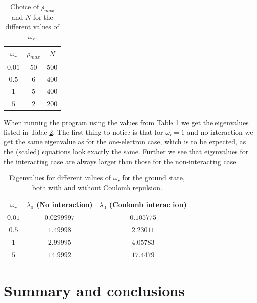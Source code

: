 \documentclass[12pt, a4paper]{article}
\begin{document}
\begin{table}
\begin{center}
\caption{Choice of $\rho_{max}$ and $N$ for the different values of $\omega_r$.}
\label{tab:rho_and_N}
\begin{tabular}{ccc} \hline \hline  
$\omega_r$ & $\rho_{max}$ & $N$ \\ \hline
$0.01$ & $50$ & $500$ \\
$0.5$  & $6$  & $400$ \\
$1$    & $5$  & $400$ \\
$5$    & $2$  & $200$ \\ \hline\hline
\end{tabular}
\end{center}
\end{table} 

When running the program using the values from Table \ref{tab:rho_and_N} we get the eigenvalues listed 
in Table \ref{tab:eigenvalues_2p}. The first thing to notice is that for $\omega_r=1$ and no interaction 
we get the same eigenvalue as for the one-electron case, which is to be expected, as the (scaled) 
equations look exactly the same. Further we see that eigenvalues for the interacting case are always 
larger than those for the non-interacting case.  

\begin{table}
\begin{center}
\caption{Eigenvalues for different values of $\omega_r$ for the ground state, both with and 
without Coulomb repulsion.}
\label{tab:eigenvalues_2p}
\begin{tabular}{ccc} \hline \hline
$\omega_r$ & $\lambda_0$ (No interaction) & $\lambda_0$ (Coulomb interaction) \\ \hline
$0.01$ & $0.0299997$ & $0.105775$ \\
$0.5$  & $1.49998$   & $2.23011$  \\
$1$    & $2.99995$   & $4.05783$  \\
$5$    & $14.9992$   & $17.4479$  \\ \hline \hline
\end{tabular}
\end{center}
\end{table}

\section{Summary and conclusions}
\end{document}
